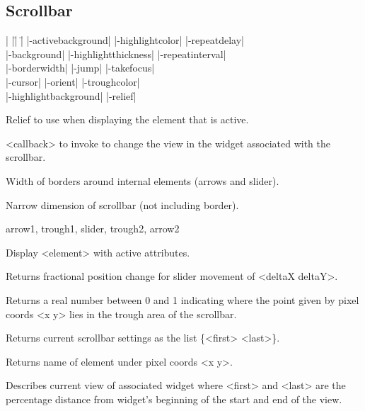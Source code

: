 \subsection*{Scrollbar}
\vspace{-4pt}

\begin{tabbing}
|                   |\=|                     |\= \kill
|-activebackground| \> |-highlightcolor|     \> |-repeatdelay| \\   
|-background|       \> |-highlightthickness| \> |-repeatinterval| \\
|-borderwidth|      \> |-jump| 		     \> |-takefocus| \\
|-cursor|           \> |-orient|             \> |-troughcolor| \\   
|-highlightbackground| \> |-relief| \\   
\end{tabbing}

\vskip5pt
\begin{enum}{1cm}

Relief to use when displaying the element that is active.

<callback> to invoke to change the view in
the widget associated with the scrollbar.

Width of borders around internal elements (arrows and slider).
 
Narrow dimension of scrollbar (not including border).

\end{enum}
\begin{enum}{2cm}
 arrow1, trough1, slider, trough2, arrow2
\end{enum}
\vskip5pt
\begin{enum}{1cm}

Display <element> with active attributes.

Returns fractional position change for slider movement of <deltaX deltaY>.

Returns a real number between 0 and 1 indicating where the point given
by pixel coords <x y> lies in the trough area of the scrollbar.

Returns current scrollbar settings as the list \{<first> <last>\}.

Returns name of element under pixel coords <x y>.

Describes current view of associated widget where <first> and <last> are the
percentage distance from widget's beginning of the start and end of
the view.

\end{enum}

